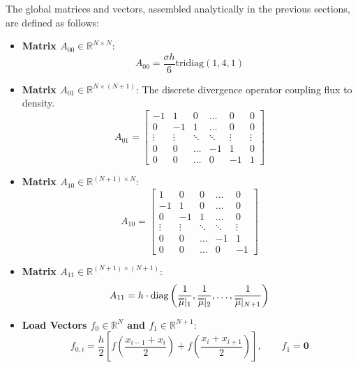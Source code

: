\documentclass{article}
\begin{document}
The global matrices and vectors, assembled analytically in the previous sections, are defined as follows:

\begin{itemize}
    \item \textbf{Matrix $A_{00} \in \mathbb{R}^{N \times N}$}: 
    \begin{equation}
        A_{00} = \frac{\sigma h}{6} \text{tridiag}(1, 4, 1)
    \end{equation}
    
    \item \textbf{Matrix $A_{01} \in \mathbb{R}^{N \times (N+1)}$}: The discrete divergence operator coupling flux to density.
    \begin{equation}
        A_{01} = 
        \begin{bmatrix}
            -1 &  1 &  0 & \dots &  0 &  0 \\
             0 & -1 &  1 & \dots &  0 &  0 \\
        \vdots & \vdots & \ddots & \ddots & \vdots & \vdots \\
             0 &  0 & \dots & -1 &  1 &  0 \\
             0 &  0 & \dots &  0 & -1 &  1
        \end{bmatrix}
    \end{equation}

    \item \textbf{Matrix $A_{10} \in \mathbb{R}^{(N+1) \times N}$}:
    \begin{equation}
        A_{10} = 
        \begin{bmatrix}
             1 &  0 &  0 & \dots &  0 \\
            -1 &  1 &  0 & \dots &  0 \\
             0 & -1 &  1 & \dots &  0 \\
        \vdots & \vdots & \ddots & \ddots & \vdots \\
             0 &  0 & \dots & -1 &  1 \\
             0 &  0 & \dots &  0 & -1
        \end{bmatrix}
    \end{equation}

    \item \textbf{Matrix $A_{11} \in \mathbb{R}^{(N+1) \times (N+1)}$}:
    \begin{equation}
        A_{11} = h \cdot \text{diag}\left( \frac{1}{\overline{\vphantom{\rule{0pt}{1.2ex}}\smash{\overline{\mu}}}|_1}, \frac{1}{\overline{\vphantom{\rule{0pt}{1.2ex}}\smash{\overline{\mu}}}|_2}, \dots, \frac{1}{\overline{\vphantom{\rule{0pt}{1.2ex}}\smash{\overline{\mu}}}|_{N+1}} \right)
    \end{equation}

    \item \textbf{Load Vectors $f_0 \in \mathbb{R}^N$ and $f_1 \in \mathbb{R}^{N+1}$}: 
    \begin{equation}
        f_{0,i} = \frac{h}{2} \left[ f\left( \frac{x_{i-1} + x_i }{2} \right) + f\left( \frac{x_{i} + x_{i+1} }{2} \right) \right] , \quad \quad f_1 = \mathbf{0}
    \end{equation}
\end{itemize}
\end{document}

